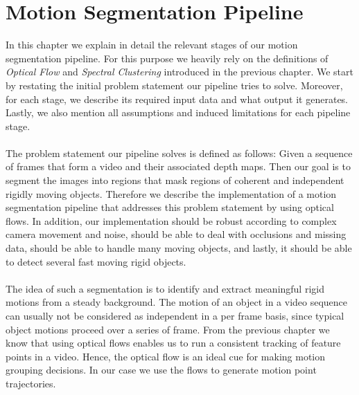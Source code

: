 \chapter{Motion Segmentation Pipeline}
In this chapter we explain in detail the relevant stages of our motion segmentation pipeline. For this purpose we heavily rely on the definitions of \textit{Optical Flow} and \textit{Spectral Clustering} introduced in the previous chapter. We start by restating the initial problem statement our pipeline tries to solve. Moreover, for each stage, we describe its required input data and what output it generates. Lastly, we also mention all assumptions and induced limitations for each pipeline stage. \\ \\
The problem statement our pipeline solves is defined as follows: Given a sequence of frames that form a video and their associated depth maps. Then our goal is to segment the images into regions that mask regions of coherent and independent rigidly moving objects. Therefore we describe the implementation of a motion segmentation pipeline that addresses this problem statement by using optical flows. In addition, our implementation should be robust according to complex camera movement and noise, should be able to deal with occlusions and missing data, should be able to handle many moving objects, and lastly, it should be able to detect several fast moving rigid objects. \\ \\
The idea of such a segmentation is to identify and extract meaningful rigid motions from a steady background. The motion of an object in a video sequence can usually not be considered as independent in a per frame basis, since typical object motions proceed over a series of frame. From the previous chapter we know that using optical flows enables us to run a consistent tracking of feature points in a video. Hence, the optical flow is an ideal cue for making motion grouping decisions. In our case we use the flows to generate motion point trajectories.
